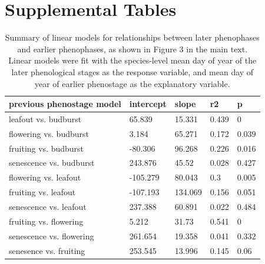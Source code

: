\documentclass{article}
\begin{document}
\section* {Supplemental Tables}
\begin{table}[ht]
\centering
\caption{Summary of linear models for relationships between later phenophases and earlier phenophases, as shown in Figure 3 in the main text. Linear models were fit with the species-level mean day of year of the later phenological stages as the response variable,
and mean day of year of earlier phenostage as the explanatory variable.} 
\label{table:prevphase}
\begin{tabular}{|p{}|p{}p{}p{}p{}|}
  \hline
previous phenostage model & intercept & slope & r2 & p \\ 
  \hline
leafout vs. budburst & 65.839 & 15.331 & 0.439 & 0 \\ 
  flowering vs. budburst & 3.184 & 65.271 & 0.172 & 0.039 \\ 
  fruiting vs. budburst & -80.306 & 96.268 & 0.226 & 0.016 \\ 
  senescence vs. budburst & 243.876 & 45.52 & 0.028 & 0.427 \\ 
  flowering vs. leafout & -105.279 & 80.043 & 0.3 & 0.005 \\ 
  fruiting vs. leafout & -107.193 & 134.069 & 0.156 & 0.051 \\ 
  senescence vs. leafout & 237.388 & 60.891 & 0.022 & 0.484 \\ 
  fruiting vs. flowering & 5.212 & 31.73 & 0.541 & 0 \\ 
  senescence vs. flowering & 261.654 & 19.358 & 0.041 & 0.332 \\ 
  senesence vs. fruiting & 253.545 & 13.996 & 0.145 & 0.06 \\ 
   \hline
\end{tabular}
\end{table}%
\end{document}
